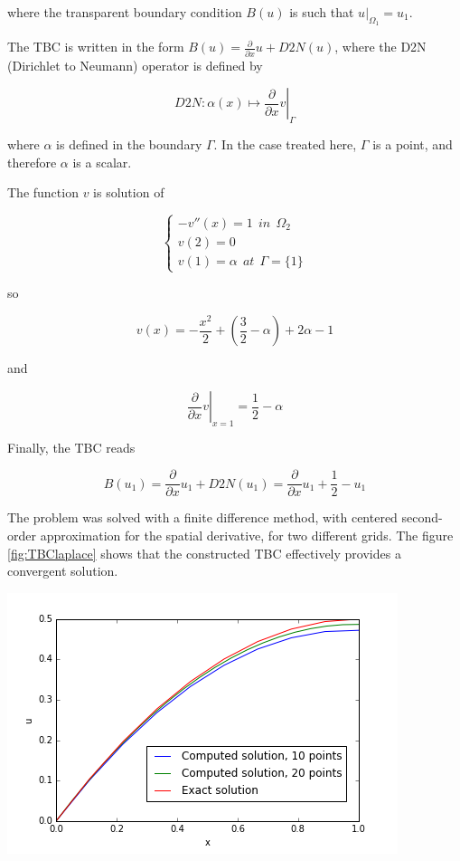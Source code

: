 \noindent where the transparent boundary condition $B(u)$ is such that $u|_{\Omega_1} = u_1$.

\indent The TBC is written in the form $B(u) = \frac{\partial}{\partial x}u + D2N(u)$, where the D2N (Dirichlet to Neumann) operator is defined by

$$\left. D2N : \alpha(x) \mapsto \frac{\partial}{\partial x}v \right\rvert_\Gamma$$

\noindent where $\alpha$ is defined in the boundary $\Gamma$. In the case treated here, $\Gamma$ is a point, and therefore $\alpha$ is a scalar.

\indent The function $v$ is solution of

\begin{equation}
\begin{cases}
-v''(x) = 1 \ \ in \ \ \Omega_2\\
v(2) = 0 \\
v(1) = \alpha \ \ at \ \ \Gamma=\{1\}
\end{cases}
\end{equation}

\noindent so

$$v(x) = -\frac{x^2}{2} + \left(\frac{3}{2} - \alpha \right) + 2\alpha -1$$

\noindent and 

$$\left. \frac{\partial}{\partial x}v \right\rvert_{x=1} = \frac{1}{2} - \alpha$$

\indent Finally, the TBC reads

$$B(u_1) = \frac{\partial}{\partial x}u_1 + D2N(u_1) = \frac{\partial}{\partial x}u_1+ \frac{1}{2} - u_1$$

\indent The problem was solved with a finite difference method, with centered second-order approximation for the spatial derivative, for two different grids. The figure \ref{fig:TBClaplace} shows that the constructed TBC effectively provides a convergent solution.

\begin{center}
	\includegraphics[scale=.5]{figures/TBClaplace.png}
\end{center}


